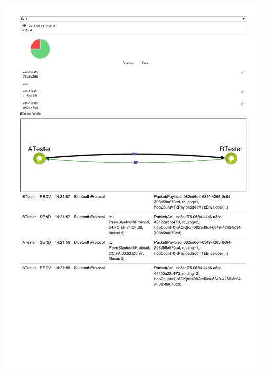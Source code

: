 \includegraphics[trim=0 150 0 0,clip,scale=0.8]{belege/manuelle-tests/netzwerk/Dashboardauszuege/Netzwerktest_n-iv-1a.pdf}
\clearpage
